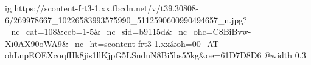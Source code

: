  
 
 
 
 

\ifcmt
  ig https://scontent-frt3-1.xx.fbcdn.net/v/t39.30808-6/269978667_10226583993575990_5112590600990494657_n.jpg?_nc_cat=108&ccb=1-5&_nc_sid=b9115d&_nc_ohc=C8BiBvw-Xi0AX90oWA9&_nc_ht=scontent-frt3-1.xx&oh=00_AT-ohLnpEOEXcoqfHk8jis1llKjpG5LSnduN8Bi5bs55kg&oe=61D7D8D6
  @width 0.3

\fi
